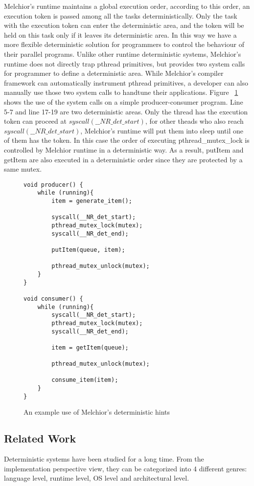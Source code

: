 \documentclass{sig-alternate}
\begin{document}
Melchior's runtime maintains a global execution order, according to this order, an execution token is passed among all the tasks deterministically. Only the task with the execution token can enter the deterministic area, and the token will be held on this task only if it leaves its deterministic area. In this way we have a more flexible deterministic solution for programmers to control the behaviour of their parallel programs. Unlike other runtime deterministic systems, Melchior's runtime does not directly trap pthread primitives, but provides two system calls for programmer to define a deterministic area. While Melchior's compiler framework can automatically instrument pthread primitives, a developer can also manually use those two system calls to handtune their applications. Figure ~\ref{fig:p1-1} shows the use of the system calls on a simple producer-consumer program. Line 5-7 and line 17-19 are two deterministic areas. Only the thread has the execution token can proceed at $syscall(\_\_NR\_det\_start)$, for other theads who also reach $syscall(\_\_NR\_det\_start)$, Melchior's runtime will put them into sleep until one of them has the token. In this case the order of executing pthread\_mutex\_lock is controlled by Melchior runtime in a deterministic way. As a result, putItem and getItem are also executed in a deterministic order since they are protected by a same mutex.

\begin{figure}
\centering
\begin{lstlisting}[frame=single,breaklines=true]
void producer() {
	while (running){
		item = generate_item();

		syscall(__NR_det_start);
		pthread_mutex_lock(mutex);
		syscall(__NR_det_end);
    
		putItem(queue, item);
    
		pthread_mutex_unlock(mutex);
	}
}

void consumer() {
	while (running){
		syscall(__NR_det_start);
		pthread_mutex_lock(mutex);
		syscall(__NR_det_end);
    
		item = getItem(queue);
    
		pthread_mutex_unlock(mutex);
		
		consume_item(item);
	}
}
\end{lstlisting}
\caption{An example use of Melchior's deterministic hints}
\label{fig:p1-1}
\end{figure}

\subsection{Related Work}
Deterministic systems have been studied for a long time. From the implementation perspective view, they can be categorized into 4 different genres: language level, runtime level, OS level and architectural level.
\end{document}

